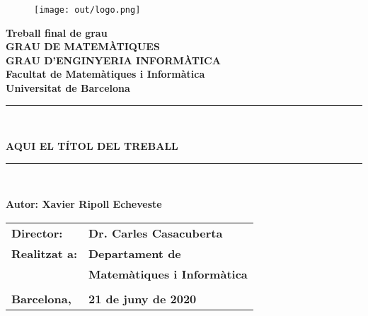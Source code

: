 \begin{titlepage}
\pagestyle{empty}
\begin{center}
\begin{figure}[htb]
\begin{center}
\texttt{[image: out/logo.png]}
\end{center}
\end{figure}

\textbf{\LARGE Treball final de grau} \\
\vspace*{.5cm}
\textbf{\LARGE GRAU DE MATEM\`{A}TIQUES } \\
\textbf{\LARGE GRAU D'ENGINYERIA INFORMÀTICA } \\
\vspace*{.5cm}
\textbf{\LARGE Facultat de Matem\`atiques i Inform\`atica\\ Universitat de Barcelona} \\
\vspace*{1.5cm}
\rule{16cm}{0.1mm}\\
\begin{Huge}
\textbf{AQUI EL T\'ITOL DEL TREBALL} \\
\end{Huge}
\rule{16cm}{0.1mm}\\

\vspace{1cm}

\begin{flushright}
\textbf{\LARGE Autor: Xavier Ripoll Echeveste}

\vspace*{2cm}

\renewcommand{\arraystretch}{1.5}
\begin{tabular}{ll}
\textbf{\Large Director:} & \textbf{\Large Dr. Carles Casacuberta } \\
\textbf{\Large Realitzat a:} & \textbf{\Large  Departament de   } \\
 & \textbf{\Large Matemàtiques i Informàtica} \\
\\
\textbf{\Large Barcelona,} & \textbf{\Large 21 de juny de 2020 }
\end{tabular}

\end{flushright}

\end{center}

\end{titlepage}
